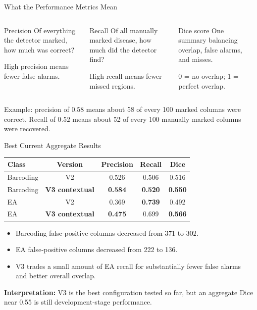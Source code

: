 \documentclass[aspectratio=169]{beamer}
\begin{document}
\begin{frame}{What the Performance Metrics Mean}

\begin{columns}[T]
\begin{block}{Precision}
Of everything the detector marked, how much was correct?

High precision means fewer false alarms.
\end{block}

\begin{block}{Recall}
Of all manually marked disease, how much did the detector find?

High recall means fewer missed regions.
\end{block}

\begin{block}{Dice score}
One summary balancing overlap, false alarms, and misses.

$0$ = no overlap; $1$ = perfect overlap.
\end{block}
\end{columns}

\vspace{0.45cm}

Example: precision of $0.58$ means about 58 of every 100 marked columns were
correct. Recall of $0.52$ means about 52 of every 100 manually marked columns
were recovered.

\end{frame}

\begin{frame}{Best Current Aggregate Results}

\begin{table}
\centering
\begin{tabular}{lcccc}
\toprule
Class & Version & Precision & Recall & Dice \\
\midrule
Barcoding & V2 & 0.526 & 0.506 & 0.516 \\
Barcoding & \textbf{V3 contextual} & \textbf{0.584} & \textbf{0.520} & \textbf{0.550} \\
\midrule
EA & V2 & 0.369 & \textbf{0.739} & 0.492 \\
EA & \textbf{V3 contextual} & \textbf{0.475} & 0.699 & \textbf{0.566} \\
\bottomrule
\end{tabular}
\end{table}

\begin{itemize}
    \item Barcoding false-positive columns decreased from 371 to 302.
    \item EA false-positive columns decreased from 222 to 136.
    \item V3 trades a small amount of EA recall for substantially fewer false
    alarms and better overall overlap.
\end{itemize}

\textbf{Interpretation:} V3 is the best configuration tested so far, but an
aggregate Dice near 0.55 is still development-stage performance.

\end{frame}
\end{document}
